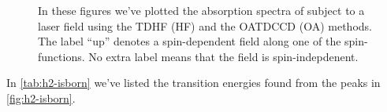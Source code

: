 \begin{figure}
            \caption{In these figures we've plotted the absorption spectra of
             subject to a laser field using the TDHF (HF) and the OATDCCD
            (OA) methods.
            The label ``up'' denotes a spin-dependent field along one of the
            spin-functions.
            No extra label means that the field is spin-indepdenent.}
            \label{fig:h2-isborn}
        \end{figure}
        In \autoref{tab:h2-isborn} we've listed the transition energies found
        from the peaks in \autoref{fig:h2-isborn}.
